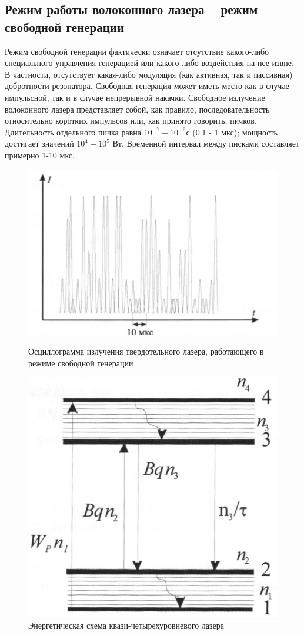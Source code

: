\documentclass[a4paper, 12pt]{article}
\begin{document}
	\subsection{Режим работы волоконного лазера – режим свободной генерации}
	Режим свободной генерации фактически означает отсутствие какого-либо специального управления генерацией или какого-либо воздействия на нее извне. В частности, отсутствует какая-либо модуляция (как активная, так и пассивная) добротности резонатора. Свободная генерация может иметь место как в случае импульсной, так и в случае непрерывной накачки. Свободное излучение волоконного лазера представляет собой, как правило, последовательность относительно коротких импульсов или, как принято говорить, пичков. Длительность отдельного пичка равна $10^{-7}-10^{-6}с$ (0.1 - 1 мкс); мощность достигает значений $10^4-10^5$ Вт. Временной интервал между писками составляет примерно 1-10 мкс.
	\begin{figure}[!htb]
		\centering
		\includegraphics[width=\linewidth]{pic1.jpg}
		\caption{Осциллограмма излучения твердотельного лазера, работающего в режиме свободной генерации}
		\endminipage\hfill
		\includegraphics[scale=0.2]{pic2.jpg}
		\caption{Энергетическая схема квази-четырехуровневого лазера}
		\endminipage
	\end{figure}
\end{document}
